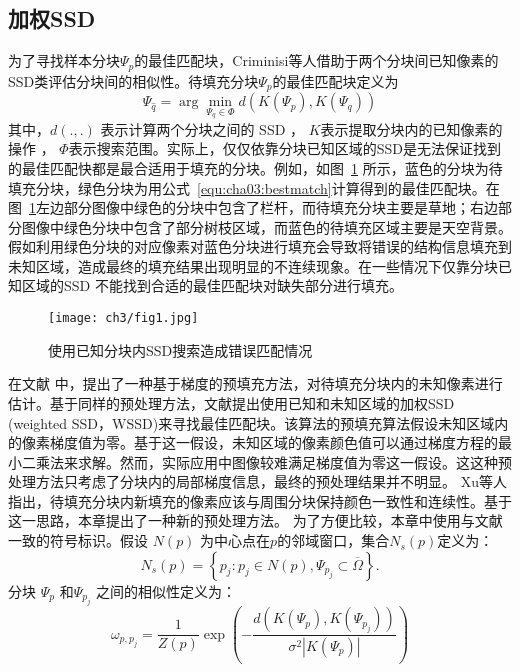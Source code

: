  \subsection{加权SSD}
 \label{sec:sub:WSSD}
 为了寻找样本分块\(\Psi_p\)的最佳匹配块，Criminisi等人\cite{Criminisi04regionfilling}借助于两个分块间已知像素的SSD类评估分块间的相似性。待填充分块\(\Psi_p\)的最佳匹配块定义为
 \begin{equation}
 \label{equ:cha03:bestmatch}
 \Psi_{\hat{q}}= \arg \min_{\Psi_q\in\Phi}d(K(\Psi_p),K(\Psi_q))
 \end{equation}
 其中，\(d(.,.)\) 表示计算两个分块之间的 SSD ， \(K\)表示提取分块内的已知像素的操作 ， \(\Phi\)表示搜索范围。实际上，仅仅依靠分块已知区域的SSD是无法保证找到的最佳匹配快都是最合适用于填充的分块。例如，如图~\ref{cha03:fig:1} 所示，蓝色的分块为待填充分块，绿色分块为用公式~\ref{equ:cha03:bestmatch}计算得到的最佳匹配块。在图~\ref{cha03:fig:1}左边部分图像中绿色的分块中包含了栏杆，而待填充分块主要是草地；右边部分图像中绿色分块中包含了部分树枝区域，而蓝色的待填充区域主要是天空背景。假如利用绿色分块的对应像素对蓝色分块进行填充会导致将错误的结构信息填充到未知区域，造成最终的填充结果出现明显的不连续现象。在一些情况下仅靠分块已知区域的SSD 不能找到合适的最佳匹配块对缺失部分进行填充。
 \begin{figure}[!htbp]
 	\begin{center}
 			\texttt{[image: ch3/fig1.jpg]}
 	\end{center}
     \caption{使用已知分块内SSD搜索造成错误匹配情况}
 	\label{cha03:fig:1}
 \end{figure}
 在文献 中，提出了一种基于梯度的预填充方法，对待填充分块内的未知像素进行估计。基于同样的预处理方法，文献提出使用已知和未知区域的加权SSD (weighted SSD，WSSD)来寻找最佳匹配块。该算法的预填充算法假设未知区域内的像素梯度值为零。基于这一假设，未知区域的像素颜色值可以通过梯度方程的最小二乘法来求解。然而，实际应用中图像较难满足梯度值为零这一假设。这这种预处理方法只考虑了分块内的局部梯度信息，最终的预处理结果并不明显。 Xu等人\cite{Xu:2010}指出，待填充分块内新填充的像素应该与周围分块保持颜色一致性和连续性。基于这一思路，本章提出了一种新的预处理方法。
 为了方便比较，本章中使用与文献一致的符号标识。假设 \(N(p)\) 为中心点在\(p\)的邻域窗口，集合\(N_s(p)\)定义为：
 $$N_s(p)= \left\{ p_j:p_j \in N(p),\Psi_{p_j} \subset \overline{\Omega} \right\}.$$
 分块 \(\Psi_p\) 和\(\Psi_{p_j}\)  之间的相似性定义为：
 $$\omega_{p,p_{j}}=\frac{1}{Z(p)}\exp\left(-\frac{d(K(\Psi_p),K(\Psi_{p_j}))}{\sigma^2\left|K(\Psi_p)\right|}\right)$$
